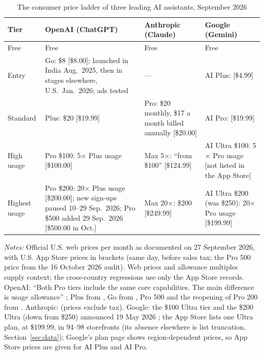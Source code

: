 \documentclass[11pt]{article}
\theoremstyle{definition}
\theoremstyle{remark}
\begin{document}
\begin{table}[t]
\centering
\begin{threeparttable}
\caption{The consumer price ladder of three leading AI assistants, September 2026}\label{tab:ladder}
\small
\begin{tabularx}{\textwidth}{@{}l>{\raggedright\arraybackslash}X>{\raggedright\arraybackslash}X>{\raggedright\arraybackslash}X@{}}
\toprule
Tier & OpenAI (ChatGPT) & Anthropic (Claude) & Google (Gemini) \\
\midrule
Free & Free & Free & Free \\
Entry & Go: \$8 [\$8.00]; launched in India Aug.\ 2025, then in stages elsewhere, U.S.\ Jan.\ 2026; ads tested & --- & AI Plus: [\$4.99] \\
Standard & Plus: \$20 [\$19.99] & Pro: \$20 monthly, \$17 a month billed annually [\$20.00] & AI Pro: [\$19.99] \\
High usage & Pro \$100: 5$\times$ Plus usage [\$100.00] & Max 5$\times$: ``from \$100'' [\$124.99] & AI Ultra \$100: 5$\times$ Pro usage [not listed in the App Store] \\
Highest usage & Pro \$200: 20$\times$ Plus usage [\$200.00]; new sign-ups paused 10--29 Sep.\ 2026; Pro \$500 added 29 Sep.\ 2026 [\$500.00 in Oct.] & Max 20$\times$: \$200 [\$249.99] & AI Ultra \$200 (was \$250): 20$\times$ Pro usage [\$199.99] \\
\bottomrule
\end{tabularx}
\begin{tablenotes}[flushleft]\footnotesize
\item \emph{Notes:} Official U.S. web prices per month as documented on 27 September 2026, with U.S. App Store prices in brackets (same day, before sales tax; the Pro 500 price from the 16 October 2026 audit). Web prices and allowance multiples supply context; the cross-country regressions use only the App Store records. OpenAI: ``Both Pro tiers include the same core capabilities. The main difference is usage allowance'' \citep{openai2026pro}; Plus from \citet{openai2026plus}, Go from \citet{openai2026go}, Pro 500 and the reopening of Pro 200 from \citet{openai2026releasenotes,openai2026prorevision}. Anthropic: \citet{anthropic2026pricing} (prices exclude tax). Google: the \$100 Ultra tier and the \$200 Ultra (down from \$250) announced 19 May 2026 \citep{google2026io}; the App Store lists one Ultra plan, at \$199.99, in 94--98 storefronts (its absence elsewhere is list truncation, Section~\ref{sec:data}); Google's plan page shows region-dependent prices, so App Store prices are given for AI Plus and AI Pro.
\end{tablenotes}
\end{threeparttable}
\end{table}
\end{document}

